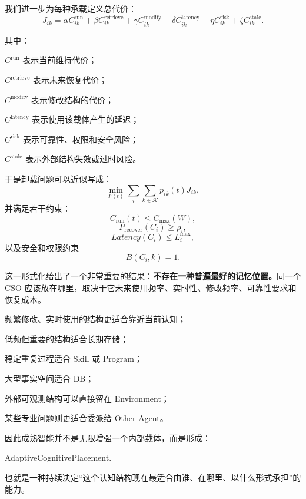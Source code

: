我们进一步为每种承载定义总代价：
\begin{equation}
J_{ik}
=
\alpha C^{\mathrm{run}}_{ik}
+
\beta C^{\mathrm{retrieve}}_{ik}
+
\gamma C^{\mathrm{modify}}_{ik}
+
\delta C^{\mathrm{latency}}_{ik}
+
\eta C^{\mathrm{risk}}_{ik}
+
\zeta C^{\mathrm{stale}}_{ik}.
\end{equation}

其中：

$C^{\mathrm{run}}$ 表示当前维持代价；

$C^{\mathrm{retrieve}}$ 表示未来恢复代价；

$C^{\mathrm{modify}}$ 表示修改结构的代价；

$C^{\mathrm{latency}}$ 表示使用该载体产生的延迟；

$C^{\mathrm{risk}}$ 表示可靠性、权限和安全风险；

$C^{\mathrm{stale}}$ 表示外部结构失效或过时风险。

于是卸载问题可以近似写成：
\begin{equation}
\min_{P(t)}
\sum_i
\sum_{k\in\mathcal K}
p_{ik}(t)J_{ik},
\end{equation}
并满足若干约束：
\begin{equation}
C_{\mathrm{run}}(t)
\leq
C_{\max}(W),
\end{equation}
\begin{equation}
P_{\mathrm{recover}}(C_i)
\geq
\rho_i,
\end{equation}
\begin{equation}
Latency(C_i)
\leq
L_i^{\max},
\end{equation}
以及安全和权限约束
\begin{equation}
B(C_i,k)=1.
\end{equation}

这一形式化给出了一个非常重要的结果：\textbf{不存在一种普遍最好的记忆位置。}同一个 CSO 应该放在哪里，取决于它未来使用频率、实时性、修改频率、可靠性要求和恢复成本。

频繁修改、实时使用的结构更适合靠近当前认知；

低频但重要的结构适合长期存储；

稳定重复过程适合 Skill 或 Program；

大型事实空间适合 DB；

外部可观测结构可以直接留在 Environment；

某些专业问题则更适合委派给 Other Agent。

因此成熟智能并不是无限增强一个内部载体，而是形成：
\begin{statementbox}
AdaptiveCognitivePlacement.
\end{statementbox}
也就是一种持续决定“这个认知结构现在最适合由谁、在哪里、以什么形式承担”的能力。

